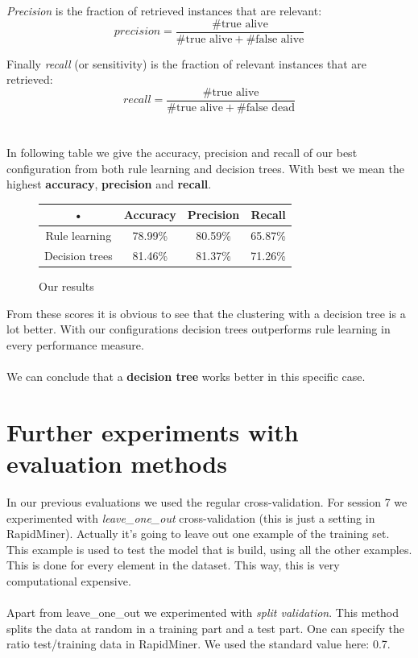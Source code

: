 \documentclass[11pt,a4paper]{article}
\begin{document}
\emph{Precision} is the fraction of retrieved instances that are relevant:
$$precision = \frac{\#\text{true alive}}{\#\text{true alive} + \#\text{false alive}}$$

Finally \emph{recall} (or sensitivity) is the fraction of relevant instances that are retrieved:
$$recall = \frac{\#\text{true alive}}{\#\text{true alive} + \#\text{false dead}}$$
\\
\\
In following table we give the accuracy, precision and recall of our best configuration from both rule learning and decision trees. With best we mean the highest \textbf{accuracy}, \textbf{precision} and \textbf{recall}.
\begin{figure}[H]
\centering
\begin{tabular}{c|c|c|c}

• & Accuracy & Precision & Recall \\ 
\hline 
Rule learning & 78.99\% & 80.59\% & 65.87\% \\ 
\hline 
Decision trees & 81.46\% & 81.37\% & 71.26\% \\ 

\end{tabular} 
\caption{Our results}
\end{figure}
From these scores it is obvious to see that the clustering with a decision tree is a lot better. With our configurations decision trees outperforms rule learning in every performance measure.
\\
\\
We can conclude that a \textbf{decision tree} works better in this specific case.
\pagebreak
\section{Further experiments with evaluation methods}

In our previous evaluations we used the regular cross-validation.
For session 7 we experimented with \textit{leave\_one\_out} cross-validation (this is just a setting in RapidMiner). Actually it's going to leave out one example of the training set. This example is used to test the model that is build, using all the other examples. This is done for every element in the dataset. This way, this is very computational expensive. 
\\
\\
Apart from leave\_one\_out we experimented with \textit{split validation}. This method splits the data at random in a training part and a test part. One can specify the ratio test/training data in RapidMiner. We used the standard value here: 0.7.
\end{document}

